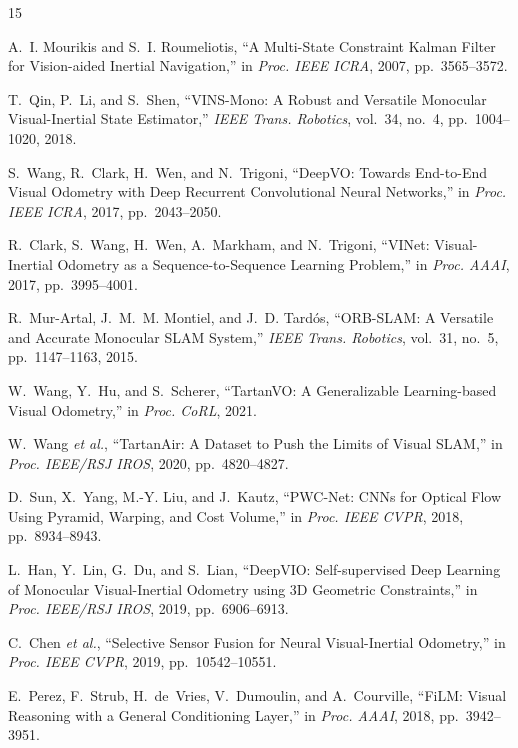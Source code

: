 \documentclass[conference]{IEEEtran}
\begin{document}
\begin{thebibliography}{15}

A.~I. Mourikis and S.~I. Roumeliotis, ``A Multi-State Constraint Kalman Filter for Vision-aided Inertial Navigation,'' in \textit{Proc. IEEE ICRA}, 2007, pp.~3565--3572.

T.~Qin, P.~Li, and S.~Shen, ``VINS-Mono: A Robust and Versatile Monocular Visual-Inertial State Estimator,'' \textit{IEEE Trans. Robotics}, vol.~34, no.~4, pp.~1004--1020, 2018.

S.~Wang, R.~Clark, H.~Wen, and N.~Trigoni, ``DeepVO: Towards End-to-End Visual Odometry with Deep Recurrent Convolutional Neural Networks,'' in \textit{Proc. IEEE ICRA}, 2017, pp.~2043--2050.

R.~Clark, S.~Wang, H.~Wen, A.~Markham, and N.~Trigoni, ``VINet: Visual-Inertial Odometry as a Sequence-to-Sequence Learning Problem,'' in \textit{Proc. AAAI}, 2017, pp.~3995--4001.

R.~Mur-Artal, J.~M.~M. Montiel, and J.~D. Tard\'{o}s, ``ORB-SLAM: A Versatile and Accurate Monocular SLAM System,'' \textit{IEEE Trans. Robotics}, vol.~31, no.~5, pp.~1147--1163, 2015.

W.~Wang, Y.~Hu, and S.~Scherer, ``TartanVO: A Generalizable Learning-based Visual Odometry,'' in \textit{Proc. CoRL}, 2021.

W.~Wang \textit{et al.}, ``TartanAir: A Dataset to Push the Limits of Visual SLAM,'' in \textit{Proc. IEEE/RSJ IROS}, 2020, pp.~4820--4827.

D.~Sun, X.~Yang, M.-Y. Liu, and J.~Kautz, ``PWC-Net: CNNs for Optical Flow Using Pyramid, Warping, and Cost Volume,'' in \textit{Proc. IEEE CVPR}, 2018, pp.~8934--8943.

L.~Han, Y.~Lin, G.~Du, and S.~Lian, ``DeepVIO: Self-supervised Deep Learning of Monocular Visual-Inertial Odometry using 3D Geometric Constraints,'' in \textit{Proc. IEEE/RSJ IROS}, 2019, pp.~6906--6913.

C.~Chen \textit{et al.}, ``Selective Sensor Fusion for Neural Visual-Inertial Odometry,'' in \textit{Proc. IEEE CVPR}, 2019, pp.~10542--10551.

E.~Perez, F.~Strub, H.~de~Vries, V.~Dumoulin, and A.~Courville, ``FiLM: Visual Reasoning with a General Conditioning Layer,'' in \textit{Proc. AAAI}, 2018, pp.~3942--3951.


\end{thebibliography}
\end{document}
